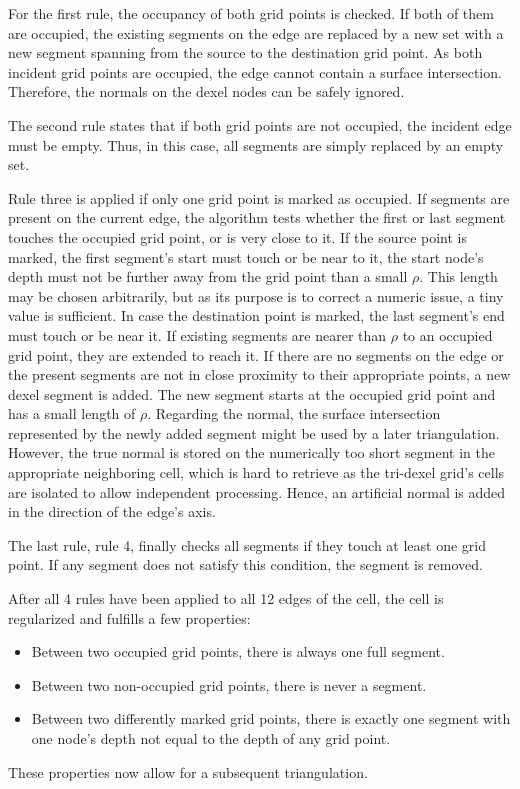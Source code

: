For the first rule, the occupancy of both grid points is checked.
If both of them are occupied, the existing segments on the edge are replaced by a new set with a new segment spanning from the source to the destination grid point.
As both incident grid points are occupied, the edge cannot contain a surface intersection.
Therefore, the normals on the dexel nodes can be safely ignored.

The second rule states that if both grid points are not occupied, the incident edge must be empty.
Thus, in this case, all segments are simply replaced by an empty set.

Rule three is applied if only one grid point is marked as occupied.
If segments are present on the current edge, the algorithm tests whether the first or last segment touches the occupied grid point, or is very close to it.
If the source point is marked, the first segment's start must touch or be near to it, \ie the start node's depth must not be further away from the grid point than a small $\rho$.
This length may be chosen arbitrarily, but as its purpose is to correct a numeric issue, a tiny value is sufficient.
In case the destination point is marked, the last segment's end must touch or be near it.
If existing segments are nearer than $\rho$ to an occupied grid point, they are extended to reach it.
If there are no segments on the edge or the present segments are not in close proximity to their appropriate points, a new dexel segment is added.
The new segment starts at the occupied grid point and has a small length of $\rho$.
Regarding the normal, the surface intersection represented by the newly added segment might be used by a later triangulation.
However, the true normal is stored on the numerically too short segment in the appropriate neighboring cell, which is hard to retrieve as the tri-dexel grid's cells are isolated to allow independent processing.
Hence, an artificial normal is added in the direction of the edge's axis.

The last rule, rule 4, finally checks all segments if they touch at least one grid point.
If any segment does not satisfy this condition, the segment is removed.

After all 4 rules have been applied to all 12 edges of the cell, the cell is regularized and fulfills a few properties:
\begin{itemize}
	\item Between two occupied grid points, there is always one full segment.
	\item Between two non-occupied grid points, there is never a segment.
	\item Between two differently marked grid points, there is exactly one segment with one node's depth not equal to the depth of any grid point.
\end{itemize}
These properties now allow for a subsequent triangulation.


